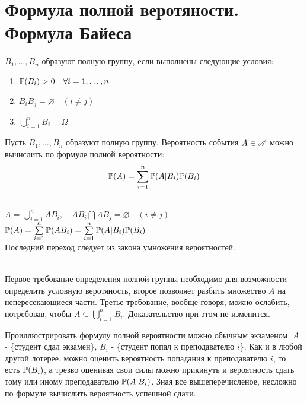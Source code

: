 \documentclass[../TV&MS.tex]{subfiles}
\begin{document}
    
\section{Формула полной веротяности. Формула Байеса}

\begin{Def}
$B_1, \ldots, B_n$ образуют \underline{полную группу}, если выполнены следующие условия:
	\begin{enumerate}
		\item $\mathbb{P}(B_i) > 0 \quad \forall i = 1, \ldots, n$
		\item $B_iB_j = \varnothing \quad (i \not= j)$
		\item $\bigcup\limits_{i=1}^nB_i = \Omega$
	\end{enumerate}
\end{Def}

\begin{Th}
Пусть $B_1, \ldots, B_n$ образуют полную группу. Вероятность события $A \in \mathscr{A}$ можно вычислить по \underline{формуле полной вероятности}:
$$\mathbb{P}(A) = \sum\limits_{i=1}^{n} \mathbb{P}(A|B_i)\mathbb{P}(B_i)$$
\end{Th}

\begin{Proof}
\\
$A=\bigcup\limits_{i=1}^{n}AB_i, \quad AB_i \bigcap AB_j = \varnothing \quad (i \not= j)$ \\
$\mathbb{P}(A) = \sum\limits_{i=1}^n \mathbb{P}(AB_i) = \sum\limits_{i=1}^{n} \mathbb{P}(A|B_i)\mathbb{P}(B_i)$ \\
Последний переход следует из  закона умножения вероятностей.
\end{Proof}
\\

Первое требование определения полной группы необходимо для возможности определить условную веротяность, второе позволяет 
разбить множество $A$ на непересекающиеся части. Третье требование, вообще говоря, можно ослабить, потребовав, чтобы $A \subseteq \bigcup\limits_{i=1}^nB_i$.
Доказательство при этом не изменится. \\
\begin{Ex}
Проиллюстрировать формулу полной вероятности можно обычным экзаменом: $A$ - \{студент сдал экзамен\}, $B_i$ - \{студент попал к преподавателю $i$\}.
Как и в любой другой лотерее, можно оценить вероятность попадания к преподавателю $i$, то есть $\mathbb{P}(B_i)$, а трезво оценивая свои силы можно прикинуть 
и вероятность сдать тому или иному преподавателю $\mathbb{P}(A|B_i)$. Зная все вышеперечисленое, несложно по формуле вычислить вероятность успешной сдачи.
\end{Ex}
\\
\end{document}
